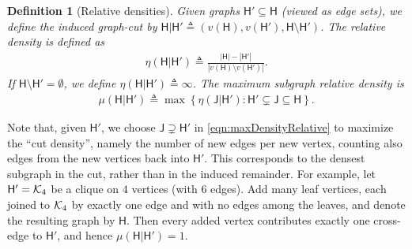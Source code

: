 \documentclass[12pt]{article}
\newtheorem{definition}{Definition}
\newcommand{\sd}{\mu}
\newcommand{\calK}{{\cal K}}
\newcommand{\ppp}[1]{\left\{#1\right\}}
\newcommand{\s}[1]{\mathsf{#1}}
\begin{document}
\begin{definition}[Relative densities]\label{def:relative}
Given graphs $\s{H}' \subseteq \s{H}$ (viewed as edge sets), we define the induced graph-cut by $\s{H} \vert \s{H}' \triangleq (v(\s{H}), v(\s{H}'), \s{H} \setminus \s{H}')$. The relative density is defined as
\begin{align}
\eta(\s{H} \vert \s{H}') \triangleq \frac{|\s{H}| - |\s{H}'|}{|v(\s{H}) \setminus v(\s{H}')|}.
\end{align}
If $\s{H}\setminus \s{H}' = \emptyset$, we define $\eta(\s{H} \vert \s{H}')\triangleq \infty$. The maximum subgraph relative density is
\begin{align}
\sd(\s{H}\vert\s{H}')\triangleq\max\ppp{\eta(\s{J} \vert \s{H}'):\s{H}'\subsetneq\s{J}\subseteq\s{H}}.\label{eqn:maxDensityRelative}
\end{align}
\end{definition}
Note that, given $\s{H}'$, we choose $\s{J} \supsetneq \s{H}'$ in \eqref{eqn:maxDensityRelative} to maximize the ``cut density'', namely the number of new edges per new vertex, counting also edges from the new vertices back into $\s{H}'$. This corresponds to the densest subgraph in the cut, rather than in the induced remainder. For example, let $\s{H}' = \calK_4$ be a clique on $4$ vertices (with $6$ edges). Add many leaf vertices, each joined to $\calK_4$ by exactly one edge and with no edges among the leaves, and denote the resulting graph by $\s{H}$. Then every added vertex contributes exactly one cross-edge to $\s{H}'$, and hence $\sd(\s{H} \vert \s{H}') = 1$.
\end{document}
